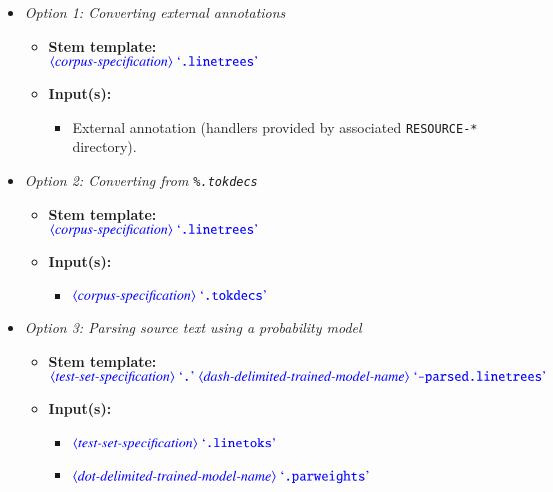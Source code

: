 \documentclass[12pt]{report}
\def\blue{\color{blue}}
\begin{document}
\begin{itemize}
      \item \textit{Option 1: Converting external annotations}
      \begin{itemize}
            \item \textbf{Stem template:}\\
            $\dtype{corpus-specification} \ \dcode{.linetrees}$
            \item \textbf{Input(s):}
            \begin{itemize}
                  \item External annotation (handlers provided by associated {\tt RESOURCE-*} directory).
            \end{itemize}
      \end{itemize}
      \item \textit{Option 2: Converting from {\blue\tt \%.tokdecs}}
      \begin{itemize}
            \item \textbf{Stem template:}\\
            $\dtype{corpus-specification} \ \dcode{.linetrees}$
            \item \textbf{Input(s):}
            \begin{itemize}
                  \item $\dtype{corpus-specification} \ \dcode{.tokdecs}$
            \end{itemize}
      \end{itemize}
      \item \textit{Option 3: Parsing source text using a probability model}
      \begin{itemize}
            \item \textbf{Stem template:}\\
            $\dtype{test-set-specification} \ \dcode{.} \ \dtype{dash-delimited-trained-model-name} \ \dcode{-parsed.linetrees}$
            \item \textbf{Input(s):}
            \begin{itemize}
                  \item $\dtype{test-set-specification} \ \dcode{.linetoks}$
                  \item $\dtype{dot-delimited-trained-model-name} \ \dcode{.parweights}$
            \end{itemize}
      \end{itemize}
\end{itemize}
\end{document}
